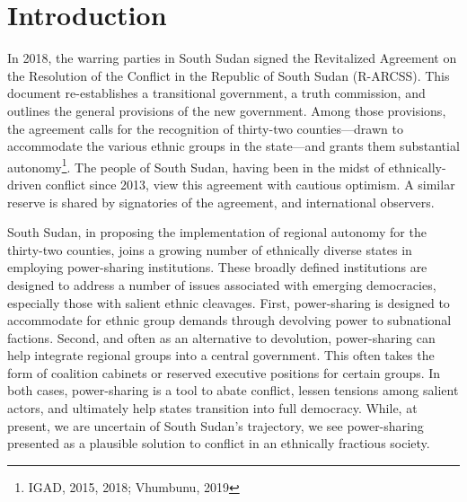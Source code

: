 \documentclass[12pt]{article}
\begin{document}


\pagebreak


\doublespacing

\section{Introduction}
In 2018, the warring parties in South Sudan signed the Revitalized Agreement on the Resolution of the Conflict in the Republic of South Sudan (R-ARCSS). This document re-establishes a transitional government, a truth commission, and outlines the general provisions of the new government. Among those provisions, the agreement calls for the recognition of thirty-two counties---drawn to accommodate the various ethnic groups in the state---and grants them substantial autonomy\footnote{IGAD, 2015, 2018; Vhumbunu, 2019}. The people of South Sudan, having been in the midst of ethnically-driven conflict since 2013, view this agreement with cautious optimism. A similar reserve is shared by signatories of the agreement, and international observers. 

South Sudan, in proposing the implementation of regional autonomy for the thirty-two counties, joins a growing number of ethnically diverse states in employing power-sharing institutions. These broadly defined institutions are designed to address a number of issues associated with emerging democracies, especially those with salient ethnic cleavages. First, power-sharing is designed to accommodate for ethnic group demands through devolving power to subnational factions. Second, and often as an alternative to devolution, power-sharing can help integrate regional groups into a central government. This often takes the form of coalition cabinets or reserved executive positions for certain groups. In both cases, power-sharing is a tool to abate conflict, lessen tensions among salient actors, and ultimately help states transition into full democracy. While, at present, we are uncertain of South Sudan's trajectory, we see power-sharing presented as a plausible solution to conflict in an ethnically fractious society. 
\end{document}
